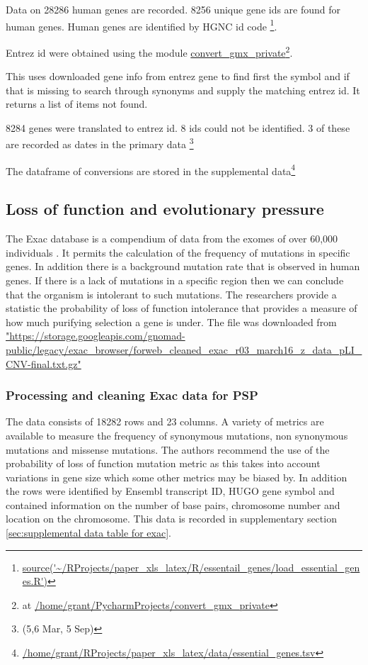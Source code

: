  Data on 28286  human genes are recorded. 8256 unique gene ids are found for human genes. Human genes are identified by HGNC id code \footnote{\url{source('~/RProjects/paper_xls_latex/R/essentail_genes/load_essential_genes.R')}}.
 
 Entrez id were obtained using the module \url{convert_gmx_private}\footnote{ at \url{/home/grant/PycharmProjects/convert_gmx_private}}.
 
 This uses downloaded gene info from entrez gene to find first the symbol and if that is missing to search through synonyms and supply the matching entrez id. It returns a list of items not found. 
 
8284 genes were translated to entrez id. 8 ids could not be identified. 3 of these are recorded as dates in the primary data \footnote{(5,6 Mar, 5 Sep)}
 
 The dataframe of conversions are stored in the supplemental data\footnote{ \url{/home/grant/RProjects/paper_xls_latex/data/essential_genes.tsv}}
\subsection{Loss of function and evolutionary pressure}

The Exac database is a compendium of data from the exomes of over 60,000 individuals \cite{lek2016analysis}. It permits the calculation of the frequency of mutations in specific genes. In addition there is a background mutation rate that is observed in human genes. If there is a lack of mutations in a specific region then we can conclude that the organism is intolerant to such mutations. The researchers provide a statistic the probability of loss of function intolerance that provides a measure of how much purifying selection a gene is under. The file was downloaded from 
\url{"https://storage.googleapis.com/gnomad-public/legacy/exac_browser/forweb_cleaned_exac_r03_march16_z_data_pLI_CNV-final.txt.gz"}

\subsubsection{Processing and cleaning Exac data for PSP}
The data consists of 18282 rows and 23 columns. A variety of metrics are available to measure the frequency of synonymous mutations, non synonymous mutations and missense mutations. The authors recommend the use of the probability of loss of function mutation metric as this takes into account variations in gene size which some other metrics may be biased by. In addition the rows were identified by Ensembl transcript ID, HUGO gene symbol and contained information on the number of base pairs, chromosome number and location on the chromosome. This data is recorded in supplementary section~
\ref{sec:supplemental data table for exac}.


